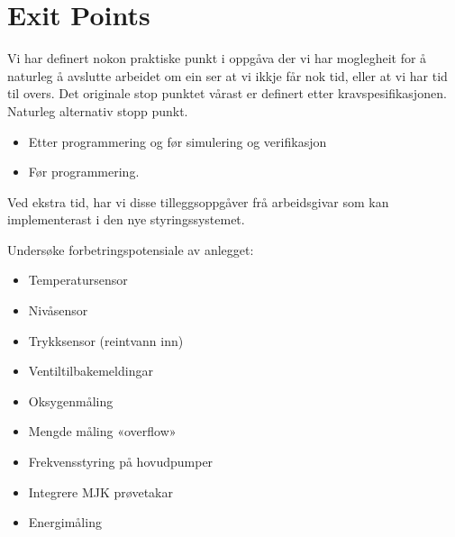 \section{Exit Points}
\thispagestyle{fancy}
Vi har definert nokon praktiske punkt i oppgåva der vi har moglegheit 
for å naturleg å avslutte arbeidet om ein ser at vi ikkje får nok tid,
eller at vi har tid til overs. 
Det originale stop punktet vårast er definert etter kravspesifikasjonen. Naturleg alternativ stopp punkt.

\begin{itemize}
    \item Etter programmering og før simulering og verifikasjon
    \item Før programmering.
\end{itemize}

Ved ekstra tid, har vi disse tilleggsoppgåver frå arbeidsgivar 
som kan implementerast i den nye styringssystemet.

Undersøke forbetringspotensiale av anlegget:
\begin{itemize}
    \item Temperatursensor
    \item Nivåsensor
    \item Trykksensor (reintvann inn)
    \item Ventiltilbakemeldingar
    \item Oksygenmåling
    \item Mengde måling «overflow»
    \item Frekvensstyring på hovudpumper
    \item Integrere MJK prøvetakar
    \item Energimåling
\end{itemize}